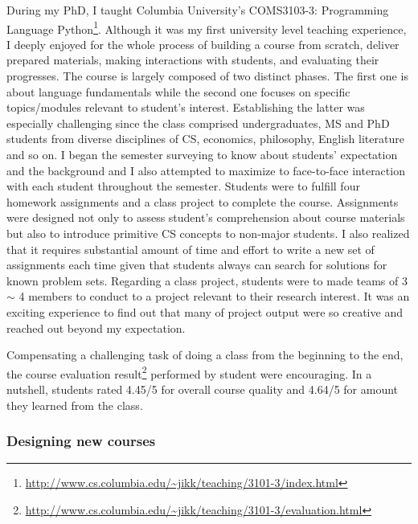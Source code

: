 \documentclass[letterpaper, 10pt]{article}
\begin{document}
\begin{small}
During my PhD, I taught Columbia University's COMS3103-3: Programming Language
Python\footnote{\url{http://www.cs.columbia.edu/~jikk/teaching/3101-3/index.html}}.
%
%
Although it was my first university level teaching experience, I deeply enjoyed
for the whole process of building a course from scratch, deliver prepared
materials, making interactions with students, and evaluating their progresses.
% 
The course is largely composed of two distinct phases. The first one is about
language fundamentals while the second one focuses on specific topics/modules
relevant to student's interest. Establishing the latter was especially
challenging since the class comprised undergraduates, MS and PhD students from
diverse disciplines of CS, economics, philosophy, English literature and so on.
%
I began the semester surveying to know about students' expectation and the
background and I also attempted to maximize to face-to-face interaction with
each student throughout the semester.
% 
Students were to fulfill four homework assignments and a class project to
complete the course. 
%
Assignments were designed not only to assess student's comprehension about
course materials but also to introduce primitive CS concepts to non-major
students.
%
%
I also realized that it requires  substantial amount of time and effort to
write a new set of assignments each time given that students always can search
for solutions for known problem sets. 
%
Regarding a class project, students were to made teams of 3 $\sim$ 4 members to
conduct to a project relevant to their research interest.
%
It was an exciting experience to find out that many of project output were so
creative and reached out beyond my expectation.
%
%

Compensating a challenging task of doing a class from the beginning to the end,
the course evaluation
result\footnote{\url{http://www.cs.columbia.edu/~jikk/teaching/3101-3/evaluation.html}}
performed by student were encouraging. In a nutshell, students rated 4.45/5 for
overall course quality and 4.64/5 for amount they learned from the class.

\subsubsection*{Designing new courses} 


\end{small}
\end{document}
